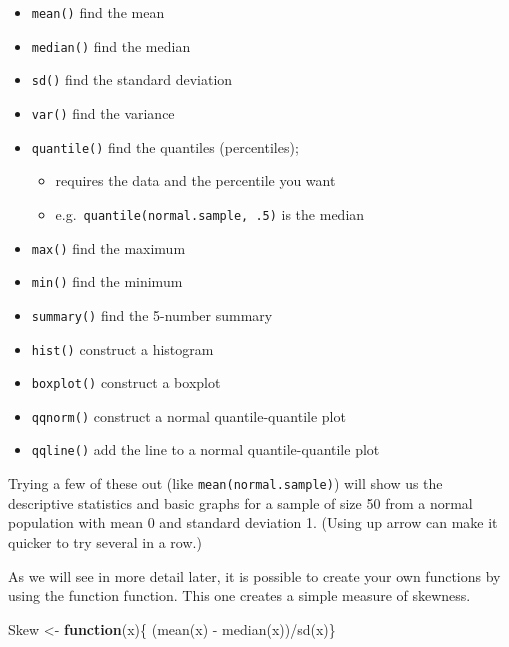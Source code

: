 \documentclass[
]{book}
\newenvironment{Shaded}{\begin{snugshade}}{\end{snugshade}}
\newcommand{\ControlFlowTok}[1]{\textcolor[rgb]{0.13,0.29,0.53}{\textbf{#1}}}
\newcommand{\FunctionTok}[1]{\textcolor[rgb]{0.00,0.00,0.00}{#1}}
\newcommand{\NormalTok}[1]{#1}
\newcommand{\OtherTok}[1]{\textcolor[rgb]{0.56,0.35,0.01}{#1}}
\newcommand{\SpecialCharTok}[1]{\textcolor[rgb]{0.00,0.00,0.00}{#1}}
\providecommand{\tightlist}{%
  \setlength{\itemsep}{0pt}\setlength{\parskip}{0pt}}
\begin{document}
\begin{itemize}
\tightlist
\item
  \texttt{mean()} find the mean
\item
  \texttt{median()} find the median
\item
  \texttt{sd()} find the standard deviation
\item
  \texttt{var()} find the variance
\item
  \texttt{quantile()} find the quantiles (percentiles);

  \begin{itemize}
  \tightlist
  \item
    requires the data and the percentile you want
  \item
    e.g.~\texttt{quantile(normal.sample,\ .5)} is the median
  \end{itemize}
\item
  \texttt{max()} find the maximum
\item
  \texttt{min()} find the minimum
\item
  \texttt{summary()} find the 5-number summary
\item
  \texttt{hist()} construct a histogram
\item
  \texttt{boxplot()} construct a boxplot
\item
  \texttt{qqnorm()} construct a normal quantile-quantile plot
\item
  \texttt{qqline()} add the line to a normal quantile-quantile plot
\end{itemize}

Trying a few of these out (like \texttt{mean(normal.sample)}) will show us the descriptive statistics and basic graphs for a sample of size 50 from a normal population with mean 0 and standard deviation 1. (Using up arrow can make it quicker to try several in a row.)

As we will see in more detail later, it is possible to create your own functions by using the function function. This one creates a simple measure of skewness.

\begin{Shaded}
\begin{Highlighting}[]
\NormalTok{Skew }\OtherTok{\textless{}{-}} \ControlFlowTok{function}\NormalTok{(x)\{}
\NormalTok{    (}\FunctionTok{mean}\NormalTok{(x) }\SpecialCharTok{{-}} \FunctionTok{median}\NormalTok{(x))}\SpecialCharTok{/}\FunctionTok{sd}\NormalTok{(x)\}}
\end{Highlighting}
\end{Shaded}
\end{document}
